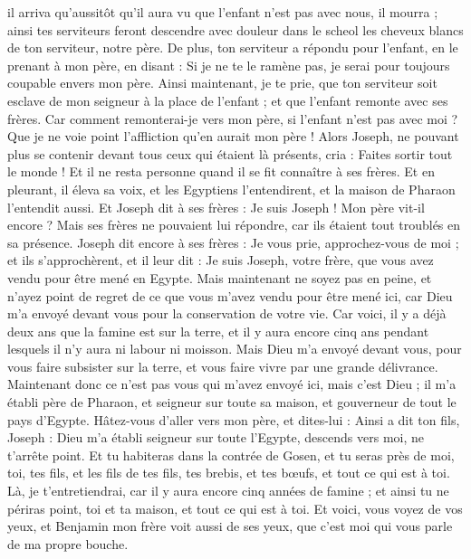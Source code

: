 \begin{multicols}{2}
il arriva qu'aussitôt qu'il aura vu que l'enfant n'est pas avec nous, il mourra ; ainsi tes serviteurs feront descendre avec douleur dans le scheol les cheveux blancs de ton serviteur, notre père.
De plus, ton serviteur a répondu pour l'enfant, en le prenant à mon père, en disant : Si je ne te le ramène pas, je serai pour toujours coupable envers mon père.
Ainsi maintenant, je te prie, que ton serviteur soit esclave de mon seigneur à la place de l'enfant ; et que l'enfant remonte avec ses frères.
Car comment remonterai-je vers mon père, si l'enfant n'est pas avec moi ? Que je ne voie point l'affliction qu'en aurait mon père !
\VerseOne{}Alors Joseph, ne pouvant plus se contenir devant tous ceux qui étaient là présents, cria : Faites sortir tout le monde ! Et il ne resta personne quand il se fit connaître à ses frères.
Et en pleurant, il éleva sa voix, et les Egyptiens l'entendirent, et la maison de Pharaon l'entendit aussi.
Et Joseph dit à ses frères : Je suis Joseph ! Mon père vit-il encore ? Mais ses frères ne pouvaient lui répondre, car ils étaient tout troublés en sa présence.
Joseph dit encore à ses frères : Je vous prie, approchez-vous de moi ; et ils s'approchèrent, et il leur dit : Je suis Joseph, votre frère, que vous avez vendu pour être mené en Egypte.
Mais maintenant ne soyez pas en peine, et n'ayez point de regret de ce que vous m'avez vendu pour être mené ici, car Dieu m'a envoyé devant vous pour la conservation de votre vie.
Car voici, il y a déjà deux ans que la famine est sur la terre, et il y aura encore cinq ans pendant lesquels il n'y aura ni labour ni moisson.
Mais Dieu m'a envoyé devant vous, pour vous faire subsister sur la terre, et vous faire vivre par une grande délivrance.
Maintenant donc ce n'est pas vous qui m'avez envoyé ici, mais c'est Dieu ; il m'a établi père de Pharaon, et seigneur sur toute sa maison, et gouverneur de tout le pays d'Egypte.
Hâtez-vous d'aller vers mon père, et dites-lui : Ainsi a dit ton fils, Joseph : Dieu m'a établi seigneur sur toute l'Egypte, descends vers moi, ne t'arrête point.
Et tu habiteras dans la contrée de Gosen, et tu seras près de moi, toi, tes fils, et les fils de tes fils, tes brebis, et tes bœufs, et tout ce qui est à toi.
Là, je t'entretiendrai, car il y aura encore cinq années de famine ; et ainsi tu ne périras point, toi et ta maison, et tout ce qui est à toi.
Et voici, vous voyez de vos yeux, et Benjamin mon frère voit aussi de ses yeux, que c'est moi qui vous parle de ma propre bouche.

\end{multicols}
